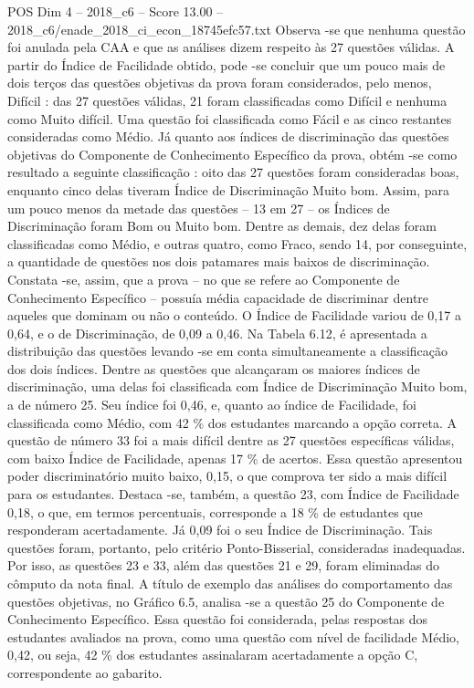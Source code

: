 \begin{textsample}{POS Dim 4 – 2018\_c6 – Score 13.00 – 2018\_c6/enade\_2018\_ci\_econ\_18745efc57.txt}
Observa -se que nenhuma questão foi anulada pela CAA e que as análises dizem respeito às 27 questões válidas.
A partir do Índice de Facilidade obtido, pode -se concluir que um pouco mais de dois terços das questões objetivas da prova foram considerados, pelo menos, Difícil : das 27 questões válidas, 21 foram classificadas como Difícil e nenhuma como Muito difícil.
Uma questão foi classificada como Fácil e as cinco restantes consideradas como Médio.
Já quanto aos índices de discriminação das questões objetivas do Componente de Conhecimento Específico da prova, obtém -se como resultado a seguinte classificação : oito das 27 questões foram consideradas boas, enquanto cinco delas tiveram Índice de Discriminação Muito bom.
Assim, para um pouco menos da metade das questões – 13 em 27 – os Índices de Discriminação foram Bom ou Muito bom.
Dentre as demais, dez delas foram classificadas como Médio, e outras quatro, como Fraco, sendo 14, por conseguinte, a quantidade de questões nos dois patamares mais baixos de discriminação.
Constata -se, assim, que a prova – no que se refere ao Componente de Conhecimento Específico – possuía média capacidade de discriminar dentre aqueles que dominam ou não o conteúdo.
O Índice de Facilidade variou de 0,17 a 0,64, e o de Discriminação, de 0,09 a 0,46.
Na Tabela 6.12, é apresentada a distribuição das questões levando -se em conta simultaneamente a classificação dos dois índices.
Dentre as questões que alcançaram os maiores índices de discriminação, uma delas foi classificada com Índice de Discriminação Muito bom, a de número 25.
Seu índice foi 0,46, e, quanto ao índice de Facilidade, foi classificada como Médio, com 42 \% dos estudantes marcando a opção correta.
A questão de número 33 foi a mais difícil dentre as 27 questões específicas válidas, com baixo Índice de Facilidade, apenas 17 \% de acertos.
Essa questão apresentou poder discriminatório muito baixo, 0,15, o que comprova ter sido a mais difícil para os estudantes.
Destaca -se, também, a questão 23, com Índice de Facilidade 0,18, o que, em termos percentuais, corresponde a 18 \% de estudantes que responderam acertadamente.
Já 0,09 foi o seu Índice de Discriminação.
Tais questões foram, portanto, pelo critério Ponto-Bisserial, consideradas inadequadas.
Por isso, as questões 23 e 33, além das questões 21 e 29, foram eliminadas do cômputo da nota final.
A título de exemplo das análises do comportamento das questões objetivas, no Gráfico 6.5, analisa -se a questão 25 do Componente de Conhecimento Específico.
Essa questão foi considerada, pelas respostas dos estudantes avaliados na prova, como uma questão com nível de facilidade Médio, 0,42, ou seja, 42 \% dos estudantes assinalaram acertadamente a opção C, correspondente ao gabarito.

\end{textsample}
